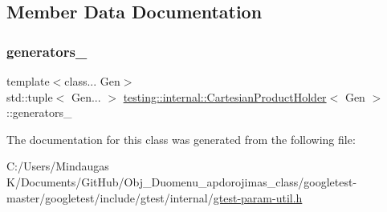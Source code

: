 \subsection{Member Data Documentation}
\mbox{\label{classtesting_1_1internal_1_1_cartesian_product_holder_ad61e0fa4c35c6eae11481cd5728cba68}} 
\subsubsection{\texorpdfstring{generators\_}{generators\_}}
{\footnotesize\ttfamily template$<$class... Gen$>$ \\
std\+::tuple$<$ Gen... $>$ \mbox{\hyperlink{classtesting_1_1internal_1_1_cartesian_product_holder}{testing\+::internal\+::\+Cartesian\+Product\+Holder}}$<$ Gen $>$\+::generators\+\_\+\hspace{0.3cm}{\ttfamily [private]}}



The documentation for this class was generated from the following file\+:\begin{DoxyCompactItemize}
\item 
C\+:/\+Users/\+Mindaugas K/\+Documents/\+Git\+Hub/\+Obj\+\_\+\+Duomenu\+\_\+apdorojimas\+\_\+class/googletest-\/master/googletest/include/gtest/internal/\mbox{\hyperlink{googletest-master_2googletest_2include_2gtest_2internal_2gtest-param-util_8h}{gtest-\/param-\/util.\+h}}\end{DoxyCompactItemize}
